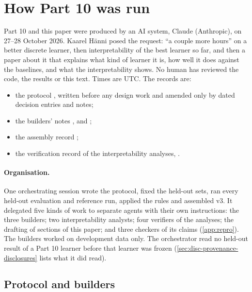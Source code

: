 \section{How Part 10 was run}\label{app:provenance}

Part 10 and this paper were produced by an AI system, Claude (Anthropic), on 27--28 October 2026. Kaarel H\"anni posed the request: ``a couple more hours'' on a better discrete learner, then interpretability of the best learner so far, and then a paper about it that explains what kind of learner it is, how well it does against the baselines, and what the interpretability shows. No human has reviewed the code, the results or this text. Times are UTC. The records are:
\begin{itemize}
\item the protocol , written before any design work and amended only by dated decision entries and notes;
\item the builders' notes ,  and ;
\item the assembly record ;
\item the verification record of the interpretability analyses, .
\end{itemize}

\paragraph{Organisation.} One orchestrating session wrote the protocol, fixed the held-out sets, ran every held-out evaluation and reference run, applied the rules and assembled v3. It delegated five kinds of work to separate agents with their own instructions: the three builders; two interpretability analysts; four verifiers of the analyses; the drafting of sections of this paper; and three checkers of its claims (\cref{app:repro}). The builders worked on development data only. The orchestrator read no held-out result of a Part 10 learner before that learner was frozen (\cref{sec:disc-provenance-disclosures} lists what it did read).

\subsection{Protocol and builders}\label{app:builders}

